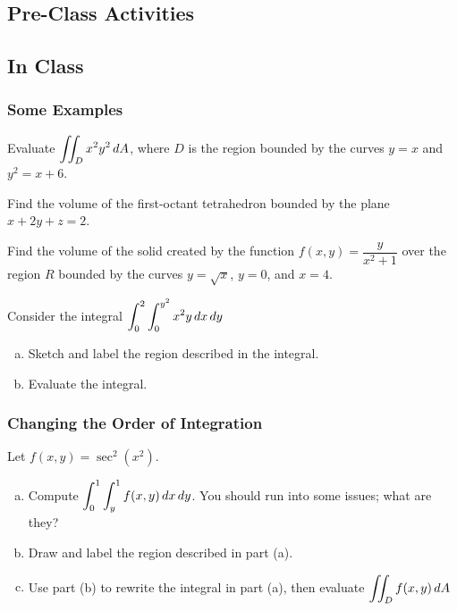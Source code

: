 \documentclass[notes]{subfiles}
\begin{document}
	\subsection*{Pre-Class Activities}
	
	
	
	\subsection*{In Class}
	
		\subsubsection*{Some Examples}
			
			\begin{ex}
				Evaluate $\displaystyle \iint_D x^2y^2\, dA$, where $D$ is the region bounded by the curves $ y = x$ and $y^2 = x+6$.
			\end{ex}
				
			\begin{ex}
				Find the volume of the first-octant tetrahedron bounded by the plane $x + 2y + z = 2$.
			\end{ex}
				
			\begin{ex}
				Find the volume of the solid created by the function $f(x,y) = \dfrac{y}{x^2+1}$ over the region $R$ bounded by the curves $y = \sqrt{x}$, $y = 0$, and $x = 4$.
			\end{ex}
				
			\begin{ex}
				Consider the integral $\displaystyle \int_0^2 \int_0^{y^2} x^2y\, dx\, dy$
				\begin{enumerate}[(a)]
					\item Sketch and label the region described in the integral.
						
					\item Evaluate the integral.
				\end{enumerate}
			\end{ex}	
				
		\subsubsection*{Changing the Order of Integration}
			
			\begin{ex}
				Let $f(x,y) = \sec^2 (x^2)$.
				\begin{enumerate}[(a)]
					\item Compute $\displaystyle \int_0^1\int_y^1 f(x,y)\, dx\, dy$.  You should run into some issues; what are they?
						\vs{1}
						
					\item Draw and label the region described in part (a).
						\vs{1}
						
					\item Use part (b) to rewrite the integral in part (a), then evaluate $\displaystyle \iint_D f(x,y)\, dA$
						\vs{1}
						
				\end{enumerate}
			\end{ex}
			
\end{document}
